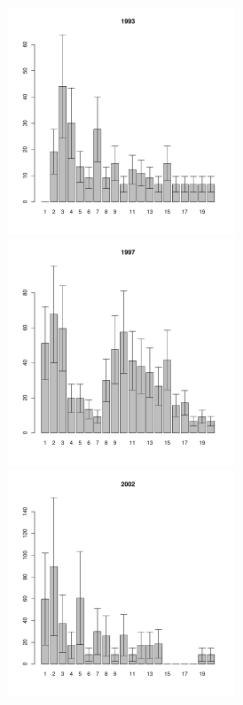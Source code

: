 \documentclass[12pt, a4paper]{article}
\begin{document}
\begin{figure}[h]
\begin{multicols}{3}
\hfill
\includegraphics[width=60mm]{../White_Sea/Luvenga_II_razrez/low_beatch_1993_.pdf}
\hfill
\includegraphics[width=60mm]{../White_Sea/Luvenga_II_razrez/low_beatch_1997_.pdf}
\hfill
\includegraphics[width=60mm]{../White_Sea/Luvenga_II_razrez/low_beatch_2002_.pdf}
\end{multicols}



\end{figure}
\end{document}

